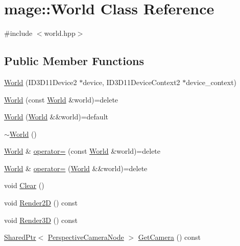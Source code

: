 \hypertarget{classmage_1_1_world}{}\section{mage\+:\+:World Class Reference}
\label{classmage_1_1_world}


{\ttfamily \#include $<$world.\+hpp$>$}

\subsection*{Public Member Functions}
\begin{DoxyCompactItemize}
\item 
\hyperlink{classmage_1_1_world_a296260d883f789b80ab22d2433dfb5a2}{World} (I\+D3\+D11\+Device2 $\ast$device, I\+D3\+D11\+Device\+Context2 $\ast$device\+\_\+context)
\item 
\hyperlink{classmage_1_1_world_a28e20e33499cd57282cefa5ab0fda041}{World} (const \hyperlink{classmage_1_1_world}{World} \&world)=delete
\item 
\hyperlink{classmage_1_1_world_a6170766c5b83465cfdbf847e67315d91}{World} (\hyperlink{classmage_1_1_world}{World} \&\&world)=default
\item 
\hyperlink{classmage_1_1_world_a8f594ba33a69c4142d599e548337bbcf}{$\sim$\+World} ()
\item 
\hyperlink{classmage_1_1_world}{World} \& \hyperlink{classmage_1_1_world_aa7074e3847c9fbe1466aa833f194eed0}{operator=} (const \hyperlink{classmage_1_1_world}{World} \&world)=delete
\item 
\hyperlink{classmage_1_1_world}{World} \& \hyperlink{classmage_1_1_world_a0440e945dfd0291174ce6dc33e5d8335}{operator=} (\hyperlink{classmage_1_1_world}{World} \&\&world)=delete
\item 
void \hyperlink{classmage_1_1_world_a5562299c0c78c7f6cb63b2de77c1fe79}{Clear} ()
\item 
void \hyperlink{classmage_1_1_world_a49e7adf01a415aefc911d69c6fcee665}{Render2D} () const
\item 
void \hyperlink{classmage_1_1_world_ad58574dabf93d67bad5b492aecc6c209}{Render3D} () const
\item 
\hyperlink{namespacemage_a1e01ae66713838a7a67d30e44c67703e}{Shared\+Ptr}$<$ \hyperlink{namespacemage_a4542f24699be53c2f30040ce575155a7}{Perspective\+Camera\+Node} $>$ \hyperlink{classmage_1_1_world_a1bbfa8f45b8e262fda28f1bfb53128b7}{Get\+Camera} () const
\item 

\end{DoxyCompactItemize}
